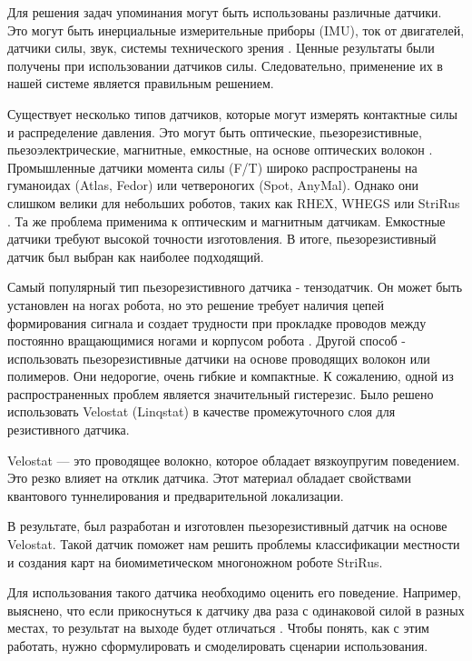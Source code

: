 Для решения задач упоминания могут быть использованы различные датчики. Это могут быть инерциальные измерительные приборы (IMU), ток от двигателей, датчики силы, звук, системы технического зрения \cite{libby_using_2012,ojeda_terrain_2006,peters_analysis_2006}. Ценные результаты были получены при использовании датчиков силы. Следовательно, применение их в нашей системе является правильным решением.

Существует несколько типов датчиков, которые могут измерять контактные силы и распределение давления. Это могут быть оптические, пьезорезистивные, пьезоэлектрические, магнитные, емкостные, на основе оптических волокон \cite{howe_dynamic_1993}. Промышленные датчики момента силы (F/T) широко распространены на гуманоидах (Atlas, Fedor) или четвероногих (Spot, AnyMal). Однако они слишком велики для небольших роботов, таких как RHEX, WHEGS или StriRus \cite{saranli_design_2000,schroerComparingCockroachWhegs2004, bulichevConceptDevelopmentBiomimetic2018}. Та же проблема применима к оптическим и магнитным датчикам. Емкостные датчики требуют высокой точности изготовления. В итоге, пьезорезистивный датчик был выбран как наиболее подходящий.

Самый популярный тип пьезорезистивного датчика - тензодатчик. Он может быть установлен на ногах робота, но это решение требует наличия цепей формирования сигнала и создает трудности при прокладке проводов между постоянно вращающимися ногами и корпусом робота \cite{wuTactileSensingTerrainBased2020}. Другой способ - использовать пьезорезистивные датчики на основе проводящих волокон или полимеров. Они недорогие, очень гибкие и компактные. К сожалению, одной из распространенных проблем является значительный гистерезис. Было решено использовать Velostat (Linqstat)\cite{vehecFlexibleResistiveSensor2020} в качестве промежуточного слоя для резистивного датчика.

Velostat --- это проводящее волокно, которое обладает вязкоупругим поведением. Это резко влияет на отклик датчика. Этот материал обладает свойствами квантового туннелирования и предварительной локализации.

В результате, был разработан и изготовлен пьезорезистивный датчик на основе Velostat. Такой датчик поможет нам решить проблемы классификации местности и создания карт на биомиметическом многоножном роботе StriRus. 

Для использования такого датчика необходимо оценить его поведение. Например, выяснено, что если прикоснуться к датчику два раза с одинаковой силой в разных местах, то результат на выходе будет отличаться . Чтобы понять, как с этим работать, нужно сформулировать и смоделировать сценарии использования.

